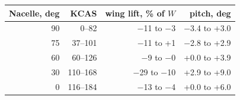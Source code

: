 \begin{tabular}{@{}rrrr@{}}
\toprule
Nacelle, deg & KCAS & wing lift, \% of $W$ & pitch, deg \\
\midrule
90 & 0--82 & $-$11 to $-$3 & $-$3.4 to +3.0 \\
75 & 37--101 & $-$11 to +1 & $-$2.8 to +2.9 \\
60 & 60--126 & $-$9 to $-$0 & +0.0 to +3.9 \\
30 & 110--168 & $-$29 to $-$10 & +2.9 to +9.0 \\
0 & 116--184 & $-$13 to $-$4 & +0.0 to +6.0 \\
\bottomrule
\end{tabular}
